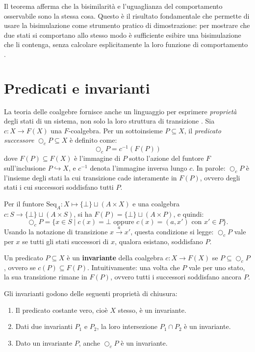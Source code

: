 Il teorema afferma che la bisimilarità e l'uguaglianza del comportamento osservabile sono la stessa cosa. Questo è il risultato fondamentale che permette di usare la bisimulazione come strumento pratico di dimostrazione: per mostrare che due stati si comportano allo stesso modo è sufficiente esibire una bisimulazione che li contenga, senza calcolare esplicitamente la loro funzione di comportamento \cite{jacobs2017,rutten2000}.

\section{Predicati e invarianti}

La teoria delle coalgebre fornisce anche un linguaggio per esprimere \textit{proprietà} degli stati di un sistema, non solo la loro struttura di transizione \cite{jacobs2017}. Sia \(c : X \to F(X)\) una \(F\)-coalgebra. Per un sottoinsieme \(P \subseteq X\), il \textit{predicato successore} \(\bigcirc_c P \subseteq X\) è definito come:
\[
  \bigcirc_c P = c^{-1}(F(P))
\]
dove \(F(P) \subseteq F(X)\) è l'immagine di \(P\) sotto l'azione del funtore \(F\) sull'inclusione \(P \hookrightarrow X\), e \(c^{-1}\) denota l'immagine inversa lungo \(c\). In parole: \(\bigcirc_c P\) è l'insieme degli stati la cui transizione cade interamente in \(F(P)\), ovvero degli stati i cui successori soddisfano tutti \(P\).

Per il funtore \(\mathrm{Seq}_A : X \mapsto \{\bot\} \sqcup (A \times X)\) e una coalgebra \(c : S \to \{\bot\} \sqcup (A \times S)\), si ha \(F(P) = \{\bot\} \sqcup (A \times P)\), e quindi:
\[
  \bigcirc_c P = \{x \in S \mid c(x) = \bot \text{ oppure } c(x) = (a, x') \text{ con } x' \in P\}.
\]
Usando la notazione di transizione \(x \xrightarrow{a} x'\), questa condizione si legge: \(\bigcirc_c P\) vale per \(x\) se tutti gli stati successori di \(x\), qualora esistano, soddisfano \(P\).

\begin{definition}[Invariante]
  Un predicato \(P \subseteq X\) è un \textbf{invariante} della coalgebra \(c : X \to F(X)\) se \(P \subseteq \bigcirc_c P\), ovvero se \(c(P) \subseteq F(P)\). Intuitivamente: una volta che \(P\) vale per uno stato, la sua transizione rimane in \(F(P)\), ovvero tutti i successori soddisfano ancora \(P\).
\end{definition}

\begin{proposition}
  Gli invarianti godono delle seguenti proprietà di chiusura:
  \begin{enumerate}
    \item Il predicato costante vero, cioè \(X\) stesso, è un invariante.
    \item Dati due invarianti \(P_1\) e \(P_2\), la loro intersezione \(P_1 \cap P_2\) è un invariante.
    \item Dato un invariante \(P\), anche \(\bigcirc_c P\) è un invariante.
  \end{enumerate}
\end{proposition}

